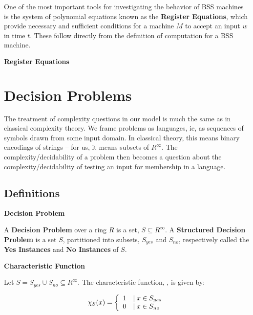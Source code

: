   One of the most important tools for investigating the behavior of
  BSS machines is the system of polynomial equations known as the
  \textbf{Register Equations}, which provide necessary and sufficient
  conditions for a machine $M$ to accept an input $w$ in time $t$.
  These follow directly from the definition of computation for a BSS
  machine. 

  \begin{definition}{\textbf{Register Equations}}
  \end{definition}
  
  \section{Decision Problems}

  The treatment of complexity questions in our model is much the same
  as in classical complexity theory.  We frame problems as languages,
  ie, as sequences of symbols drawn from some input domain.  In
  classical theory, this means binary encodings of strings -- for us,
  it means subsets of $R^\infty$.  The complexity/decidability of a
  problem then becomes a question about the complexity/decidability of
  testing an input for membership in a language.

  \subsection{Definitions}
  
  \begin{definition}{\textbf{Decision Problem}}
      
    A \textbf{Decision Problem} over a ring $R$ is a set, $S \subseteq
    R^\infty$.  A \textbf{Structured Decision Problem} is a set $S$,
    partitioned into subsets, $S_{yes}$ and $S_{no}$, respectively
    called the \textbf{Yes Instances} and \textbf{No Instances} of 
    $S$.
 
  \end{definition}

  \begin{definition}{\textbf{Characteristic Function}}

    Let $S = S_{yes} \cup S_{no} \subseteq R^{\infty}$.  The
    characteristic function,
    , is given by:

    $$\chi_S(x) = \left\{ \begin{array}{ll} 1 & \mid x \in S_{yes} \\ 0 & \mid x \in S_{no} \end{array} \right.$$
  \end{definition}

